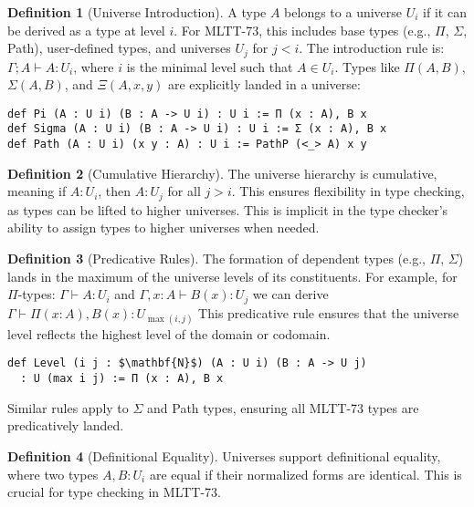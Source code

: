 \documentclass{article}
\theoremstyle{definition}
\newtheorem{definition}{Definition}
\begin{document}
\begin{definition}[Universe Introduction]
A type \( A \) belongs to a universe \( U_i \) if it can be derived as a type at
level \( i \). For MLTT-73, this includes base types (e.g., \( \Pi \), \( \Sigma \), Path),
user-defined types, and universes \( U_j \) for \( j < i \). The introduction rule is:
$\Gamma ; A \vdash A : U_i$, where $i$ is the minimal level such that $A \in U_i$.
Types like \( \Pi(A, B) \), \( \Sigma(A, B) \), and \( \Xi(A, x, y) \) are
explicitly landed in a universe:
\begin{lstlisting}[mathescape=true]
def Pi (A : U i) (B : A -> U i) : U i := Π (x : A), B x
def Sigma (A : U i) (B : A -> U i) : U i := Σ (x : A), B x
def Path (A : U i) (x y : A) : U i := PathP (<_> A) x y
\end{lstlisting}
\end{definition}

\begin{definition}[Cumulative Hierarchy]
The universe hierarchy is cumulative, meaning
if \( A : U_i \), then \( A : U_j \) for all \( j > i \).
This ensures flexibility in type checking, as types can be lifted to higher universes.
This is implicit in the type checker’s ability
to assign types to higher universes when needed.
\end{definition}

\begin{definition}[Predicative Rules]
The formation of dependent types (e.g., \( \Pi \), \( \Sigma \)) lands
in the maximum of the universe levels of its constituents. For example,
for \( \Pi \)-types: $\Gamma \vdash A : U_i$ and $\Gamma, x : A \vdash B(x) : U_j$ we
can derive $\Gamma \vdash \Pi (x : A), B(x) : U_{\max(i, j)}$
This predicative rule ensures that the universe level reflects
the highest level of the domain or codomain.
\begin{lstlisting}[mathescape=true]
def Level (i j : $\mathbf{N}$) (A : U i) (B : A -> U j)
  : U (max i j) := Π (x : A), B x
\end{lstlisting}
Similar rules apply to \( \Sigma \) and Path types,
ensuring all MLTT-73 types are predicatively landed.
\end{definition}

\begin{definition}[Definitional Equality]
Universes support definitional equality, where two types \( A, B : U_i \)
are equal if their normalized forms are identical.
This is crucial for type checking in MLTT-73.
\end{definition}
\end{document}
